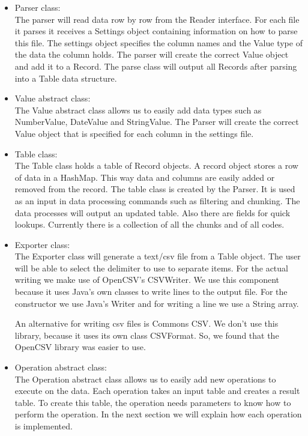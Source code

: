 \documentclass[11pt,twoside,a4paper]{article}
\begin{document}
\begin{itemize}
\item Parser class:\\
The parser will read data row by row from the Reader interface. For each file it parses it receives a Settings object containing information on how to parse this file. The settings object specifies the column names and the Value type of the data the column holds. The parser will create the correct Value object and add it to a Record. The parse class will output all Records after parsing into a Table data structure.

\item Value abstract class:\\
The Value abstract class allows us to easily add data types such as NumberValue, DateValue and StringValue.
The Parser will create the correct Value object that is specified for each column in the settings file.

\item Table class:\\ 
The Table class holds a table of Record objects. A record object stores a row of data in a HashMap. This way data and columns are easily added or removed from the record. The table class is created by the Parser. It is used as an input in data processing commands such as filtering and chunking. The data processes will output an updated table. Also there are fields for quick lookups. Currently there is a collection of all the chunks and of all codes.


\item Exporter class:\\
The Exporter class will generate a text/csv file from a Table object. The user will be able to select the delimiter to use to separate items. For the actual writing we make use of OpenCSV's CSVWriter. We use this component because it uses Java's own classes to write lines to the output file. For the constructor we use Java's Writer and for writing a line we use a String array. 

An alternative for writing csv files is Commons CSV. We don't use this library, because it uses its own class CSVFormat. So, we found that the OpenCSV library was easier to use.

\item Operation abstract class:\\
The Operation abstract class allows us to easily add new operations to execute on the data. Each operation takes an input table and creates a result table. To create this table, the operation needs parameters to know how to perform the operation. In the next section we will explain how each operation is implemented.

\end{itemize}
\end{document}

